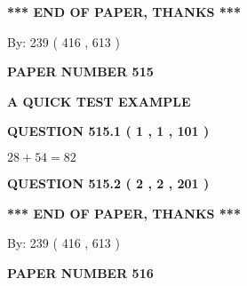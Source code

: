 \documentclass[12pt]{article}
\begin{document}
   
   
\vspace{1.0in} 
{\textbf{\large{ *** END OF PAPER, THANKS *** }}} 
   
   
\hspace{1.0in} By: 
 239 ( 416 ,  613 )
   
   
   
   
\newpage 
\setcounter{page}{ 
   515001 } 
   
   
   
   
 {\textbf{ \Large{ PAPER NUMBER  515  }}}
   
   
\vspace{0.2in}
   
   
   
   
   
   
 \vspace{0.2in}
{\LARGE {\textbf{ A QUICK TEST EXAMPLE}}}
   
   
  
\vspace{0.2in}
  
{\textbf{\Large{QUESTION
515.1 
 ( 1 , 1 , 101 )
}}}
  
  
 
 

$ %
28 +  %
54=   %
82$
 
 
  
\vspace{0.2in}
  
{\textbf{\Large{QUESTION
515.2 
 ( 2 , 2 , 201 )
}}}
  
  
   
   
 \vspace{0.2in}
 
   
   
   
   
\vspace{1.0in} 
{\textbf{\large{ *** END OF PAPER, THANKS *** }}} 
   
   
\hspace{1.0in} By: 
 239 ( 416 ,  613 )
   
   
   
   
\newpage 
\setcounter{page}{ 
   516001 } 
   
   
   
   
 {\textbf{ \Large{ PAPER NUMBER  516  }}}
   
   
\vspace{0.2in}
   
\end{document}

